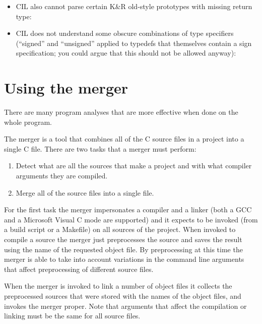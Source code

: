 \documentclass{article}
\begin{document}
\begin{itemize}
\item CIL also cannot parse certain K&R old-style prototypes with missing
return type:

\item CIL does not understand some obscure combinations of type specifiers
(``signed'' and ``unsigned'' applied to typedefs that themselves contain a
sign specification; you could argue that this should not be allowed anyway):
\end{itemize}

  \section{Using the merger}\label{sec-merger}

 There are many program analyses that are more effective when
done on the whole program.

 The merger is a tool that combines all of the C source files in a project
into a single C file. There are two tasks that a merger must perform:
\begin{enumerate}
\item Detect what are all the sources that make a project and with what
compiler arguments they are compiled.

\item Merge all of the source files into a single file. 
\end{enumerate}

 For the first task the merger impersonates a compiler and a linker (both a
GCC and a Microsoft Visual C mode are supported) and it expects to be invoked
(from a build script or a Makefile) on all sources of the project. When
invoked to compile a source the merger just preprocesses the source and saves
the result using the name of the requested object file. By preprocessing at
this time the merger is able to take into account variations in the command
line arguments that affect preprocessing of different source files.

 When the merger is invoked to link a number of object files it collects the
preprocessed sources that were stored with the names of the object files, and
invokes the merger proper. Note that arguments that affect the compilation or
linking must be the same for all source files.
\end{document}
